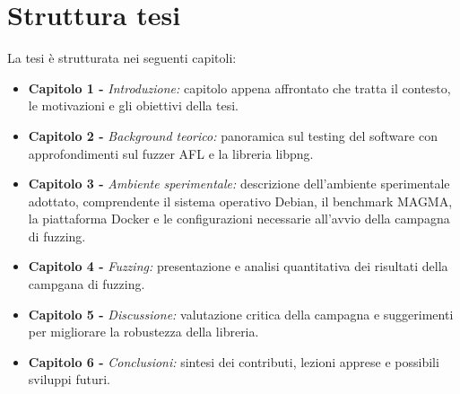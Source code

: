 \section{Struttura tesi}
La tesi è strutturata nei seguenti capitoli:
\begin{itemize}
  \item {\bf Capitolo 1 - }{\it Introduzione:} capitolo appena affrontato che tratta il contesto, le motivazioni e gli obiettivi della tesi.
  
  \item {\bf Capitolo 2 - }{\it Background teorico:} panoramica sul testing del software con approfondimenti sul fuzzer AFL e la libreria libpng.

  \item {\bf Capitolo 3 - }{\it Ambiente sperimentale:} descrizione dell’ambiente sperimentale adottato, comprendente il sistema operativo Debian, il benchmark MAGMA, la piattaforma Docker e le configurazioni necessarie all’avvio della campagna di fuzzing.

  \item {\bf Capitolo 4 - }{\it Fuzzing:} presentazione e analisi quantitativa dei risultati della campgana di fuzzing.
  
  \item {\bf Capitolo 5 - }{\it Discussione:} valutazione critica della campagna e suggerimenti per migliorare la robustezza della libreria.

  \item {\bf Capitolo 6 - }{\it Conclusioni:} sintesi dei contributi, lezioni apprese e possibili sviluppi futuri.

  
\end{itemize}

